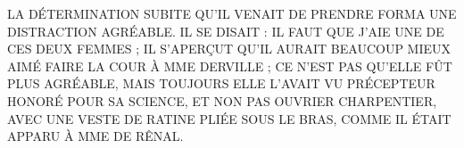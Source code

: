 \documentclass[french,11pt,a4paper]{article}
\begin{document}
\medskip

LA DÉTERMINATION SUBITE QU’IL VENAIT DE PRENDRE FORMA UNE DISTRACTION AGRÉABLE. IL SE DISAIT : IL FAUT QUE J’AIE UNE DE CES DEUX FEMMES ; IL S’APERÇUT QU’IL AURAIT BEAUCOUP MIEUX AIMÉ FAIRE LA COUR À MME DERVILLE ; CE N’EST PAS QU’ELLE FÛT PLUS AGRÉABLE, MAIS TOUJOURS ELLE L’AVAIT VU PRÉCEPTEUR HONORÉ POUR SA SCIENCE, ET NON PAS OUVRIER CHARPENTIER, AVEC UNE VESTE DE RATINE PLIÉE SOUS LE BRAS, COMME IL ÉTAIT APPARU À MME DE RÊNAL.\par

\medskip

\noindent\textcolor{blue}{}
\end{document}
